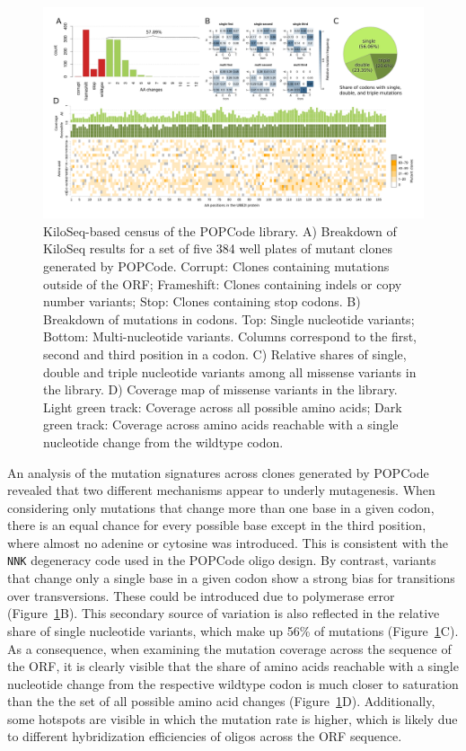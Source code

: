 \begin{landscape}
\begin{figure}[h]
	\centering
	\includegraphics[width=9in]{img/popcode_census.pdf}
	\caption{KiloSeq-based census of the  POPCode library. A) Breakdown of KiloSeq results for a set of five 384 well plates of mutant clones generated by POPCode. Corrupt: Clones containing mutations outside of the ORF; Frameshift: Clones containing indels or copy number variants; Stop: Clones containing stop codons. B) Breakdown of mutations in codons. Top: Single nucleotide variants; Bottom: Multi-nucleotide variants. Columns correspond to the first, second and third position in a codon. C) Relative shares of single, double and triple nucleotide variants among all missense variants in the library. D) Coverage map of missense variants in the library. Light green track: Coverage across all possible amino acids; Dark green track: Coverage across amino acids reachable with a single nucleotide change from the wildtype codon.}
	\label{fig:popcode_census}
\end{figure}
\end{landscape}

An analysis of the mutation signatures across clones generated by POPCode revealed that two different mechanisms appear to underly mutagenesis. When considering only mutations that change more than one base in a given codon, there is an equal chance for every possible base except in the third position, where almost no adenine or cytosine was introduced. This is consistent with the \texttt{NNK} degeneracy code used in the POPCode oligo design. By contrast, variants that change only a single base in a given codon show a strong bias for transitions over transversions. These could be introduced due to polymerase error (Figure~\ref{fig:popcode_census}B). This secondary source of variation is also reflected in the relative share of single nucleotide variants, which make up 56\% of mutations (Figure~\ref{fig:popcode_census}C). As a consequence, when examining the mutation coverage across the sequence of the ORF, it is clearly visible that the share of amino acids reachable with a single nucleotide change from the respective wildtype codon is much closer to saturation than the the set of all possible amino acid changes (Figure~\ref{fig:popcode_census}D). Additionally, some hotspots are visible in which the mutation rate is higher, which is likely due to different hybridization efficiencies of oligos across the ORF sequence.

